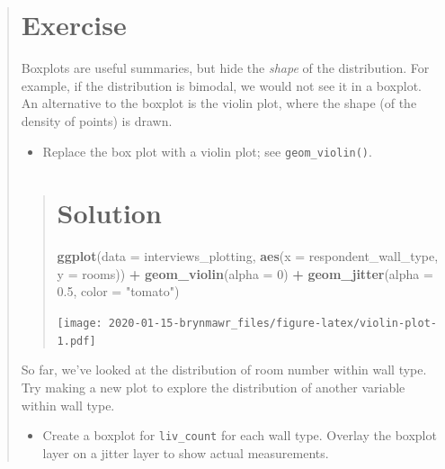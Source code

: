 \documentclass[]{book}
\newenvironment{Shaded}{\begin{snugshade}}{\end{snugshade}}
\newcommand{\KeywordTok}[1]{\textcolor[rgb]{0.13,0.29,0.53}{\textbf{#1}}}
\newcommand{\DataTypeTok}[1]{\textcolor[rgb]{0.13,0.29,0.53}{#1}}
\newcommand{\DecValTok}[1]{\textcolor[rgb]{0.00,0.00,0.81}{#1}}
\newcommand{\FloatTok}[1]{\textcolor[rgb]{0.00,0.00,0.81}{#1}}
\newcommand{\StringTok}[1]{\textcolor[rgb]{0.31,0.60,0.02}{#1}}
\newcommand{\OperatorTok}[1]{\textcolor[rgb]{0.81,0.36,0.00}{\textbf{#1}}}
\newcommand{\NormalTok}[1]{#1}
\providecommand{\tightlist}{%
  \setlength{\itemsep}{0pt}\setlength{\parskip}{0pt}}
\begin{document}
\begin{quote}
\section{Exercise}\label{exercise-12}

Boxplots are useful summaries, but hide the \emph{shape} of the
distribution. For example, if the distribution is bimodal, we would not
see it in a boxplot. An alternative to the boxplot is the violin plot,
where the shape (of the density of points) is drawn.

\begin{itemize}
\tightlist
\item
  Replace the box plot with a violin plot; see \texttt{geom\_violin()}.
\end{itemize}

\begin{quote}
\section{Solution}\label{solution-14}

\begin{Shaded}
\begin{Highlighting}[]
\KeywordTok{ggplot}\NormalTok{(}\DataTypeTok{data =}\NormalTok{ interviews_plotting, }\KeywordTok{aes}\NormalTok{(}\DataTypeTok{x =}\NormalTok{ respondent_wall_type, }\DataTypeTok{y =}\NormalTok{ rooms)) }\OperatorTok{+}
\StringTok{  }\KeywordTok{geom_violin}\NormalTok{(}\DataTypeTok{alpha =} \DecValTok{0}\NormalTok{) }\OperatorTok{+}
\StringTok{  }\KeywordTok{geom_jitter}\NormalTok{(}\DataTypeTok{alpha =} \FloatTok{0.5}\NormalTok{, }\DataTypeTok{color =} \StringTok{"tomato"}\NormalTok{)}
\end{Highlighting}
\end{Shaded}

\texttt{[image: 2020-01-15-brynmawr\_files/figure-latex/violin-plot-1.pdf]}
\end{quote}

So far, we've looked at the distribution of room number within wall
type. Try making a new plot to explore the distribution of another
variable within wall type.

\begin{itemize}
\tightlist
\item
  Create a boxplot for \texttt{liv\_count} for each wall type. Overlay
  the boxplot layer on a jitter layer to show actual measurements.
\end{itemize}


\end{quote}
\end{document}
